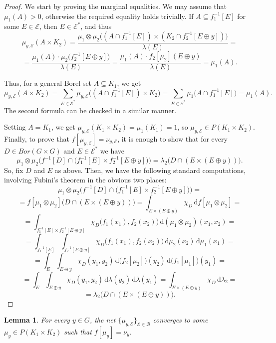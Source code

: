 \documentclass[12pt,fleqn]{amsart}
\numberwithin{equation}{section}
\newtheorem{lemma}[thm]{Lemma}
\theoremstyle{definition}
\def\B{\mathcal B}
\newcommand{\cE}{\mathcal E}
\newcommand{\sub}{\subseteq}
\begin{document}
\begin{proof}
We start by proving the marginal equalities. We may assume that $\mu_1(A)>0$, otherwise the required equality holds trivially. If $A\sub f_1^{-1}[E]$ for some $E\in\cE$, then $E\in\cE^{\ast}$, and thus 
\[ \mu_{y,\cE}(A\times K_2)=\frac{\mu_1\otimes\mu_2\big((A\cap f_1^{-1}[E])\times(K_2\cap f_2^{-1}[E\oplus y])\big)}{\lambda(E)}=\]
\[= \frac{\mu_1(A)\cdot \mu_2\big( f_2^{-1}[E\oplus y]\big)}{\lambda(E)}= \frac{\mu_1(A)\cdot f_2[\mu_2](E\oplus y)}{\lambda(E)}=\mu_1(A).\]

Thus, for a general Borel set $A\sub K_1$, we get
\[\mu_{y,\cE}(A\times K_2)=\sum_{E \in \cE^{\ast}} \mu_{y,\cE}\big((A \cap f_1^{-1}[E])\times K_2\big)=\sum_{E \in \cE^{\ast}} \mu_1\big(A \cap f_1^{-1}[E]\big)=\mu_1(A).\]
The second formula can be checked in a similar manner.

Setting $A=K_1$, we get $\mu_{y,\cE}(K_1\times K_2)=\mu_1(K_1)=1$, so $\mu_{y,\cE}\in P(K_1\times K_2)$. Finally, to prove that $f[\mu_{y,\cE}]=\nu_{y,\cE}$, it is enough to show that for every $D\in Bor(G\times G)$ and $E\in\cE^{\ast}$ we have
\[\mu_1\otimes\mu_2 \Big(f^{-1}[D]\cap \big( f_1^{-1}[E]\times f_2^{-1}[E\oplus y]\big)\Big)=\lambda_2 \big(D\cap (E\times (E\oplus y))\big).\]
So, fix $D$ and $E$ as above. Then, we have the following standard computations, involving Fubini's theorem in the obvious two places:
\[\mu_1\otimes\mu_2 \Big(f^{-1}[D]\cap \big( f_1^{-1}[E]\times f_2^{-1}[E\oplus y]\big)\Big)=\]
\[=f[\mu_1\otimes\mu_2]\big(D\cap(E\times(E\oplus y))\big)=\int_{E\times(E\oplus y)}\chi_D\,\mathrm{d}f[\mu_1\otimes\mu_2]=\]
\[=\int_{f_1^{-1}[E]\times f_2^{-1}[E\oplus y]}\chi_D\big(f_1(x_1),f_2(x_2)\big)\,\mathrm{d}(\mu_1\otimes\mu_2)(x_1,x_2)=\]
\[=\int_{f_1^{-1}[E]}\int_{f_2^{-1}[E\oplus y]}\chi_D\big(f_1(x_1),f_2(x_2)\big)\,\mathrm{d}\mu_2(x_2)\,\mathrm{d}\mu_1(x_1)=\]
\[=\int_{E}\int_{E\oplus y}\chi_D(y_1,y_2)\,\mathrm{d}\big(f_2[\mu_2]\big)(y_2)\,\mathrm{d}\big(f_1[\mu_1]\big)(y_1)=\]
\[=\int_{E}\int_{E\oplus y}\chi_D(y_1,y_2)\,\mathrm{d}\lambda(y_2)\,\mathrm{d}\lambda(y_1)=\int_{E\times(E\oplus y)}\chi_D\,\mathrm{d}\lambda_2=\]
\[=\lambda_2\big(D\cap(E\times(E\oplus y))\big).\]
\end{proof}

\begin{lemma}\label{proof:4}
For every $y\in G$, the net $\{ \mu_{y,\cE} \}_{\cE \in \B}$ converges to some $\mu_y\in P(K_1\times K_2)$
such that $f[\mu_y]=\nu_y$.
 \end{lemma}
\end{document}
